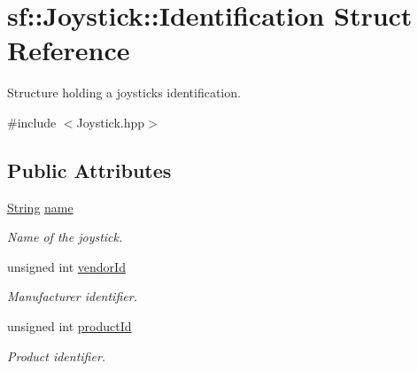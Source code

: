 \hypertarget{structsf_1_1_joystick_1_1_identification}{}\section{sf\+:\+:Joystick\+:\+:Identification Struct Reference}
\label{structsf_1_1_joystick_1_1_identification}


Structure holding a joystick\textquotesingle{}s identification.  




{\ttfamily \#include $<$Joystick.\+hpp$>$}

\subsection*{Public Attributes}
\begin{DoxyCompactItemize}
\item 
\mbox{\label{structsf_1_1_joystick_1_1_identification_a135a9a3a4dc11c2b5cde51159b4d136d}} 
\mbox{\hyperlink{classsf_1_1_string}{String}} \mbox{\hyperlink{structsf_1_1_joystick_1_1_identification_a135a9a3a4dc11c2b5cde51159b4d136d}{name}}
\begin{DoxyCompactList}\small\item\em Name of the joystick. \end{DoxyCompactList}\item 
\mbox{\label{structsf_1_1_joystick_1_1_identification_a827caf37a56492e3430e5ca6b15b5e9f}} 
unsigned int \mbox{\hyperlink{structsf_1_1_joystick_1_1_identification_a827caf37a56492e3430e5ca6b15b5e9f}{vendor\+Id}}
\begin{DoxyCompactList}\small\item\em Manufacturer identifier. \end{DoxyCompactList}\item 
\mbox{\label{structsf_1_1_joystick_1_1_identification_a18c21317789f51f9a5f132677727ff77}} 
unsigned int \mbox{\hyperlink{structsf_1_1_joystick_1_1_identification_a18c21317789f51f9a5f132677727ff77}{product\+Id}}
\begin{DoxyCompactList}\small\item\em Product identifier. \end{DoxyCompactList}\end{DoxyCompactItemize}


